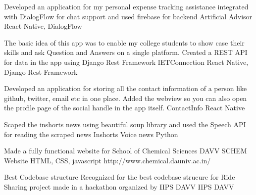 \documentclass[]{awesome-cv}
\begin{document}
\vspace{-7mm}
\begin{cventries}
	\cventry
	{Developed an application for my personal expense tracking assistance integrated with DialogFlow for chat support and used firebase for backend}
	{Artificial Advisor}
	{React Native, DialogFlow}
	{}
	{}
	
	\vspace{-5mm}
	\cventry
	{The basic idea of this app was to enable my college students to show case their skills and ask Question and Answers on a single platform. Created a REST API for data in the app using Django Rest Framework}
	{IETConnection}
	{React Native, Django Rest Framework}
	{}
	{}
	
	\vspace{-5mm}
	\cventry
	{Developed an application for storing all the contact information of a person like github, twitter, email etc in one place. Added the webview so you can also open the profile page of the social handle in the app itself.}
	{ContactInfo}
	{React Native}
	{}
	{}
	
	\vspace{-5mm}
	\cventry
	{Scaped the inshorts news using beautiful soup library and used the Speech API for reading the scraped news}
	{Inshorts Voice news}
	{Python}
	{}
	{}
	
	\vspace{-5mm}
	\cventry
	{Made a fully functional website for School of Chemical Sciences DAVV}
	{SCHEM Website}
	{HTML, CSS, javascript}
	{http://www.chemical.dauniv.ac.in/}
	{}
	
	\vspace{-5mm}
\end{cventries}
\begin{cvhonors}
	\cvhonor
	{Best Codebase structure}
	{Recognized for the best codebase strucure for Ride Sharing project made in a hackathon organized by IIPS DAVV}
	{IIPS DAVV}
	{}
\end{cvhonors}
\ 
\end{document}

